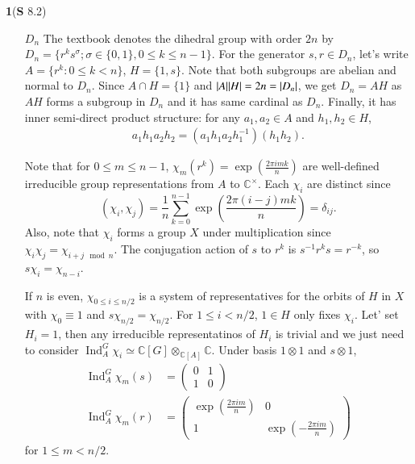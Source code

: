 \documentclass[a4paper, 12pt]{article}
\theoremstyle{Mydefinition}
\theoremstyle{Mytheorem}
\DeclareMathOperator{\Ind}{Ind}
\begin{document}
\noindent \textbf{1}(\textbf{S} 8.2)
\begin{enumerate}
    \item[$D_n$] The textbook denotes the dihedral group with order $2n$ by $D_n=\{r^ks^\sigma;\sigma\in\{0,1\},0\leq k\leq n-1\}$. For the generator $s,r\in D_n$, let's write $A=\{r^k:0\leq k<n\}$, $H = \{1, s\}$. Note that both subgroups are abelian and normal to $D_n$. Since $A\cap H = \{1\}$ and $\abs{A}\abs{H} = 2n = \abs{D_n}$, we get $D_n = AH$ as $AH$ forms a subgroup in $D_n$ and it has same cardinal as $D_n$. Finally, it has inner semi-direct product structure: for any $a_1,a_2\in A$ and $h_1,h_2\in H$,
    \begin{equation}
    \begin{split}
        a_1h_1a_2h_2 = (a_1h_1a_2h_1^{-1})(h_1h_2).
    \end{split}
    \end{equation}
    
    Note that for $0\leq m\leq n-1$, $\chi_m(r^k) = \exp\left(\frac{2\pi i mk}{n}\right)$ are well-defined irreducible group representations from $A$ to $\mathbb{C}^\times$. Each $\chi_i$ are distinct since
    \begin{equation}
        (\chi_i,\chi_j) = \frac{1}{n}\sum_{k=0}^{n-1}\exp\left(\frac{2\pi (i-j) mk}{n}\right) = \delta_{ij}.
    \end{equation}
    Also, note that $\chi_i$ forms a group $X$ under multiplication since $\chi_i\chi_j = \chi_{i+j\mod n}$. The conjugation action of $s$ to $r^k$ is $s^{-1}r^ks = r^{-k}$, so $s\chi_i = \chi_{n-i}$.
    
    If $n$ is even, $\chi_{0\leq i\leq n/2}$ is a system of representatives for the orbits of $H$ in $X$ with $\chi_0\equiv 1$ and $s \chi_{n/2} = \chi_{n/2}$. For $1\leq i<n/2$, $1\in H$ only fixes $\chi_i$. Let' set $H_i = 1$, then any irreducible representatinos of $H_i$ is trivial and we just need to consider $\Ind_A^G \chi_i\simeq \mathbb{C}[G]\otimes_{\mathbb{C}[A]}\mathbb{C}$. Under basis $1\otimes 1$ and $s\otimes 1$,
    \begin{equation}
    \begin{split}
        \Ind_A^G\chi_m(s) &= \begin{pmatrix}
        0 & 1\\
        1 & 0
        \end{pmatrix}\\
        \Ind_A^G\chi_m(r) &= \begin{pmatrix}
        \exp\left(\frac{2\pi im}{n}\right) & 0\\
        1 & \exp\left(-\frac{2\pi im}{n}\right)
        \end{pmatrix}
    \end{split}
    \end{equation}
    for $1\leq m<n/2$.
    

\end{enumerate}
\end{document}

